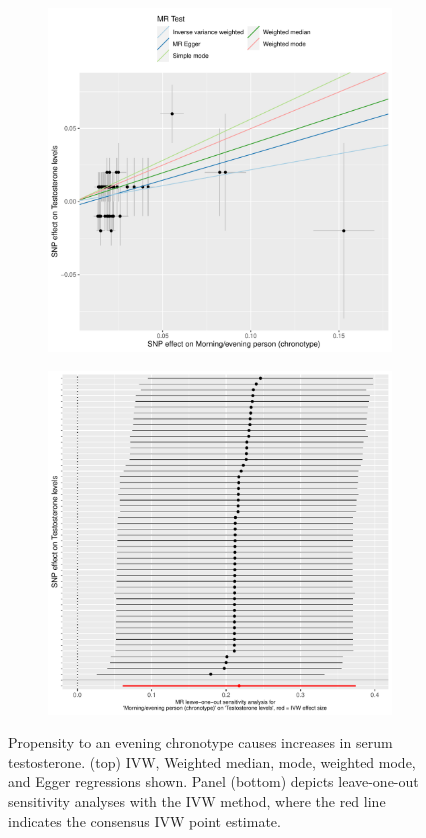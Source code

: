 \documentclass{article}
\begin{document}
% 
% 
\begin{figure}[htbp]
\begin{subfigure}{\linewidth}
\centering
	\includegraphics[width=.8\linewidth]{Figs/Analysis2/Morning_evening_person_(chronotype)_vs_Testosterone_levels.Scatterplots.pdf}
\label{testScatter}
\end{subfigure}
\begin{subfigure}{\linewidth}
\centering
	\includegraphics[width=.8\linewidth,keepaspectratio]{Figs/Analysis2/Morning_evening_person_(chronotype)_vs_Testosterone_levels.LOOplots.pdf}
\label{testLoo}
\end{subfigure}
\caption{Propensity to an evening chronotype causes increases in serum testosterone. (top) IVW, Weighted median, mode, weighted mode, and Egger regressions shown. Panel (bottom) depicts leave-one-out sensitivity analyses with the IVW method, where the red line indicates the consensus IVW point estimate.}
\label{test}
\end{figure}
\end{document}
